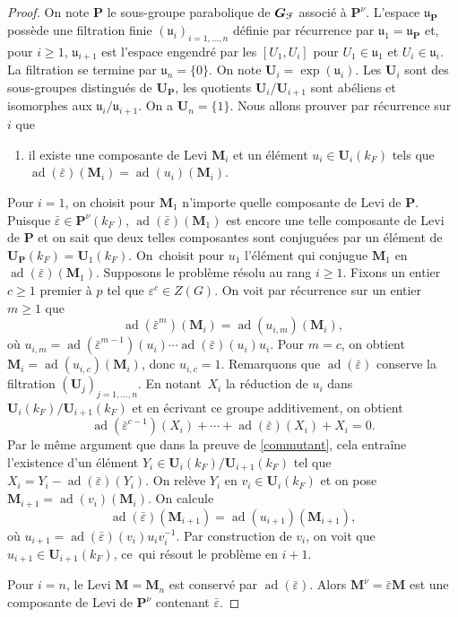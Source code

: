 \documentclass[11pt]{article}
\numberwithin{equation}{section}\providecommand{\og}{«\,}\providecommand{\fg}{\,»}
\let\mathcal \EuScript
\let\epsilon\varepsilon
\newcommand{\fru}{\mathfrak{u}}
\DeclareMathOperator{\ad}{ad}
\newcommand{\bG}{\boldsymbol{G}}
\newcommand{\bM}{\boldsymbol{M}}
\newcommand{\bP}{\boldsymbol{P}}
\newcommand{\bU}{\boldsymbol{U}}
\newcommand{\cF}{\mathcal{F}}
\theoremstyle{plain}
\theoremstyle{definition}
\begin{document}
\begin{proof}
On note $\bP$ le sous-groupe parabolique de $\bG_{\cF}$ associé à $\bP^{\nu}$. L'espace $\boldsymbol{\fru}_{\bP}$ possède une filtration finie $(\boldsymbol{\fru}_{i})_{i=1,\dots,n}$ définie par récurrence par $\boldsymbol{\fru}_{1}=\boldsymbol{\fru}_{\bP}$ et, pour $i\geq1$, $\boldsymbol{\fru}_{i+1}$ est l'espace engendré par les $[U_{1},U_{i}]$ pour $U_{1}\in \boldsymbol{\fru}_{1}$ et $U_{i}\in \boldsymbol{\fru}_{i}$. La filtration se termine par $\boldsymbol{\fru}_{n}=\{0\}$. On note $\bU_{i}=\exp(\boldsymbol{\fru}_{i})$. Les $\bU_{i}$ sont des sous-groupes distingués de $\bU_{\bP}$, les quotients $\bU_{i}/\bU_{i+1}$ sont abéliens et isomorphes aux $\boldsymbol{\fru}_{i}/\boldsymbol{\fru}_{i+1}$. On a $\bU_{n}=\{1\}$. Nous allons prouver par récurrence sur $i$ que
\begin{enumerate}
\item\label{p'unlemme1}
il existe une composante de Levi $\bM_{i}$ et un élément $u_{i}\in \bU_{i}(k_{F})$ tels que $\ad(\bar{\epsilon})(\bM_{i})=\ad(u_{i})(\bM_{i})$.
\end{enumerate}

Pour $i=1$, on choisit pour $\bM_{1}$ n'importe quelle composante de Levi de $\bP$. Puisque $\bar{\epsilon}\in \bP^{\nu}(k_{F})$, $\ad(\bar{\epsilon})(\bM_{1})$ est encore une telle composante de Levi de $\bP$ et on sait que deux telles composantes sont conjuguées par un élément de $\bU_{\bP}(k_{F})=\bU_{1}(k_{F})$. On~choisit pour $u_{1}$ l'élément qui conjugue $\bM_{1}$ en $\ad(\bar{\epsilon})(\bM_{1})$. Supposons le problème résolu au rang $i\geq1$.
Fixons un entier $c\geq1$ premier à $p$ tel que $\epsilon^c\in Z(G)$. On voit par récurrence sur un entier $m\geq1$ que
\[
\ad(\bar{\epsilon}^m)(\bM_{i})=\ad( u_{i,m})(\bM_{i}),
\]
où $u_{i,m}=\ad(\bar{\epsilon}^{m-1})(u_{i})\cdots\ad(\bar{\epsilon})(u_{i})u_{i}$. Pour $m=c$, on obtient $\bM_{i}=\ad(u_{i,c})(\bM_{i})$, donc $u_{i,c}=1$. Remarquons que $\ad(\bar{\epsilon})$ conserve la filtration $(\bU_{j})_{j=1,\dots,n}$. En notant~$X_{i}$ la réduction de $u_{i}$ dans $\bU_{i}(k_{F})/\bU_{i+1}(k_{F})$ et en écrivant ce groupe additivement, on obtient
\[
\ad(\bar{\epsilon}^{c-1})(X_{i})+\cdots+\ad(\bar{\epsilon})(X_{i})+X_{i}=0.
\]
Par le même argument que dans la preuve de \ref{commutant}, cela entraîne l'existence d'un élément $Y_{i}\in \bU_{i}(k_{F})/\bU_{i+1}(k_{F})$ tel que $X_{i}=Y_{i}-\ad(\bar{\epsilon})(Y_{i})$. On relève $Y_{i}$ en $v_{i}\in \bU_{i}(k_{F})$ et on pose $\bM_{i+1}=\ad(v_{i})(\bM_{i})$. On calcule
\[
\ad(\bar{\epsilon})(\bM_{i+1})=\ad(u_{i+1})(\bM_{i+1}),
\]
où $u_{i+1}=\ad(\bar{\epsilon})(v_{i})u_{i}v_{i}^{-1}$. Par construction de $v_{i}$, on voit que $u_{i+1}\in \bU_{i+1}(k_{F})$, ce~qui résout le problème en $i+1$.

Pour $i=n$, le Levi $\bM=\bM_{n}$ est conservé par $\ad(\bar{\epsilon})$. Alors $\bM^{\nu}=\bar{\epsilon}\bM$ est une composante de Levi de $\bP^{\nu}$ contenant $\bar{\epsilon}$.
\end{proof}
\end{document}
